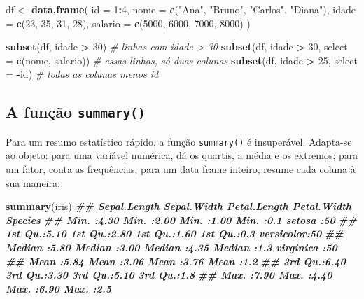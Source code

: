 \documentclass[
  portuguese,
  11pt,
  openany]{book}
\newenvironment{Shaded}{\begin{snugshade}}{\end{snugshade}}
\newcommand{\AttributeTok}[1]{\textcolor[rgb]{0.13,0.29,0.53}{#1}}
\newcommand{\CommentTok}[1]{\textcolor[rgb]{0.56,0.35,0.01}{\textit{#1}}}
\newcommand{\DecValTok}[1]{\textcolor[rgb]{0.00,0.00,0.81}{#1}}
\newcommand{\DocumentationTok}[1]{\textcolor[rgb]{0.56,0.35,0.01}{\textbf{\textit{#1}}}}
\newcommand{\FunctionTok}[1]{\textcolor[rgb]{0.13,0.29,0.53}{\textbf{#1}}}
\newcommand{\NormalTok}[1]{#1}
\newcommand{\OtherTok}[1]{\textcolor[rgb]{0.56,0.35,0.01}{#1}}
\newcommand{\SpecialCharTok}[1]{\textcolor[rgb]{0.81,0.36,0.00}{\textbf{#1}}}
\newcommand{\StringTok}[1]{\textcolor[rgb]{0.31,0.60,0.02}{#1}}
\begin{document}
\begin{Shaded}
\begin{Highlighting}[]
\NormalTok{df }\OtherTok{\textless{}{-}} \FunctionTok{data.frame}\NormalTok{(}
  \AttributeTok{id =} \DecValTok{1}\SpecialCharTok{:}\DecValTok{4}\NormalTok{,}
  \AttributeTok{nome =} \FunctionTok{c}\NormalTok{(}\StringTok{"Ana"}\NormalTok{, }\StringTok{"Bruno"}\NormalTok{, }\StringTok{"Carlos"}\NormalTok{, }\StringTok{"Diana"}\NormalTok{),}
  \AttributeTok{idade =} \FunctionTok{c}\NormalTok{(}\DecValTok{23}\NormalTok{, }\DecValTok{35}\NormalTok{, }\DecValTok{31}\NormalTok{, }\DecValTok{28}\NormalTok{),}
  \AttributeTok{salario =} \FunctionTok{c}\NormalTok{(}\DecValTok{5000}\NormalTok{, }\DecValTok{6000}\NormalTok{, }\DecValTok{7000}\NormalTok{, }\DecValTok{8000}\NormalTok{)}
\NormalTok{)}

\FunctionTok{subset}\NormalTok{(df, idade }\SpecialCharTok{\textgreater{}} \DecValTok{30}\NormalTok{)                             }\CommentTok{\# linhas com idade \textgreater{} 30}
\FunctionTok{subset}\NormalTok{(df, idade }\SpecialCharTok{\textgreater{}} \DecValTok{30}\NormalTok{, }\AttributeTok{select =} \FunctionTok{c}\NormalTok{(nome, salario))  }\CommentTok{\# essas linhas, só duas colunas}
\FunctionTok{subset}\NormalTok{(df, idade }\SpecialCharTok{\textgreater{}} \DecValTok{25}\NormalTok{, }\AttributeTok{select =} \SpecialCharTok{{-}}\NormalTok{id)               }\CommentTok{\# todas as colunas menos \textquotesingle{}id\textquotesingle{}}
\end{Highlighting}
\end{Shaded}

\subsection{\texorpdfstring{A função \texttt{summary()}}{A função summary()}}\label{a-funuxe7uxe3o-summary}

Para um resumo estatístico rápido, a função \texttt{summary()} é insuperável.
Adapta-se ao objeto: para uma variável numérica, dá os quartis, a média e os
extremos; para um fator, conta as frequências; para um data frame inteiro,
resume cada coluna à sua maneira:

\begin{Shaded}
\begin{Highlighting}[]
\FunctionTok{summary}\NormalTok{(iris)}
\DocumentationTok{\#\#   Sepal.Length   Sepal.Width    Petal.Length   Petal.Width         Species  }
\DocumentationTok{\#\#  Min.   :4.30   Min.   :2.00   Min.   :1.00   Min.   :0.1   setosa    :50  }
\DocumentationTok{\#\#  1st Qu.:5.10   1st Qu.:2.80   1st Qu.:1.60   1st Qu.:0.3   versicolor:50  }
\DocumentationTok{\#\#  Median :5.80   Median :3.00   Median :4.35   Median :1.3   virginica :50  }
\DocumentationTok{\#\#  Mean   :5.84   Mean   :3.06   Mean   :3.76   Mean   :1.2                  }
\DocumentationTok{\#\#  3rd Qu.:6.40   3rd Qu.:3.30   3rd Qu.:5.10   3rd Qu.:1.8                  }
\DocumentationTok{\#\#  Max.   :7.90   Max.   :4.40   Max.   :6.90   Max.   :2.5}
\end{Highlighting}
\end{Shaded}
\end{document}
